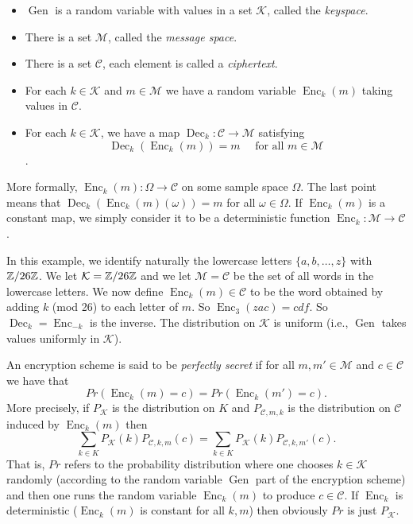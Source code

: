 \documentclass[twoside, a4paper, 10pt]{amsart}
\begin{document}
\begin{itemize} 
	\item $\operatorname{Gen}$ is a random variable with values in a set $\mathcal{K}$, called the \textit{keyspace}. 
	\item There is a set $\mathcal{M}$, called the \textit{message space}. 
	\item There is a set $\mathcal{C}$, each element is called a \textit{ciphertext}. 
	\item For each $k \in \mathcal{K}$ and $m \in \mathcal{M}$ we have a random variable $\operatorname{Enc}_k(m)$ taking values in $\mathcal{C}$.
	\item For each $k \in \mathcal{K}$, we have a map $\operatorname{Dec}_k:\mathcal{C} \to \mathcal{M}$ satisfying $$\operatorname{Dec}_k(\operatorname{Enc}_k(m)) = m \quad \text{ for all } m  \in \mathcal{M}$$. 

\end{itemize}

More formally, $\operatorname{Enc}_k(m): \Omega \to \mathcal{C}$ on some sample space $\Omega$. The last point means that $\operatorname{Dec}_k(\operatorname{Enc}_k(m)(\omega)) = m$ for all $\omega \in \Omega$. If $\operatorname{Enc}_k(m)$ is a constant map, we simply consider it to be a deterministic function $\operatorname{Enc}_k: \mathcal{M} \to \mathcal{C}$.

\begin{eg} In this example, we identify naturally the lowercase letters $\{a, b, \ldots, z\}$ with $\mathbb{Z}/26\mathbb{Z}$. We let $\mathcal{K} = \mathbb{Z}/26\mathbb{Z}$ and we let $\mathcal{M} = \mathcal{C}$ be the set of all words in the lowercase letters. We now define $\operatorname{Enc}_k(m) \in \mathcal{C}$ to be the word obtained by adding $k$ (mod 26) to each letter of $m$. So $\operatorname{Enc}_3(zac) = cdf $. So $\operatorname{Dec}_k = \operatorname{Enc}_{-k}$ is the inverse. The distribution on $\mathcal{K}$ is uniform (i.e., $\operatorname{Gen}$ takes values uniformly in $\mathcal{K}$).

\end{eg}

\begin{mydef} An encryption scheme is said to be \textit{perfectly secret} if for all $m,m' \in \mathcal{M}$ and $c \in \mathcal{C}$ we have that $$Pr(\operatorname{Enc}_k(m) = c) = Pr(\operatorname{Enc}_k(m') = c).$$ More precisely, if $P_{\mathcal{K}}$ is the distribution on $K$ and $P_{\mathcal{C},m,k}$ is the distribution on $\mathcal{C}$ induced by $\operatorname{Enc}_k(m)$ then $$\sum_{k \in K} P_{\mathcal{K}}(k) P_{\mathcal{C},k,m}(c) = \sum_{k \in K} P_{\mathcal{K}}(k) P_{\mathcal{C},k,m'}(c).$$ That is, $Pr$ refers to the probability distribution where one chooses $k \in \mathcal{K}$ randomly (according to the random variable $\operatorname{Gen}$ part of the encryption scheme) and then one runs the random variable $\operatorname{Enc}_k(m)$ to produce $c \in \mathcal{C}$. If $\operatorname{Enc}_k$ is deterministic ($\operatorname{Enc}_k(m)$ is constant for all $k,m$) then obviously $Pr$ is just $P_{\mathcal{K}}$.

\end{mydef}
\end{document}
